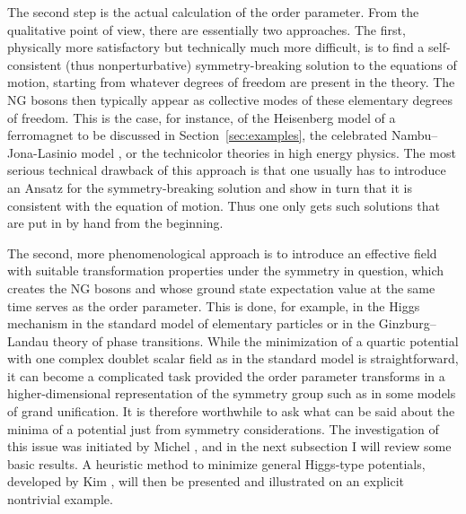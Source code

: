 \documentclass[final,2p,times,12pt,sort&compress]{elsarticle}
\begin{document}
The second step is the actual calculation of the order parameter. From the
qualitative point of view, there are essentially two approaches. The first,
physically more satisfactory but technically much more difficult, is to find a
self-consistent (thus nonperturbative) symmetry-breaking solution to the
equations of motion, starting from whatever degrees of freedom are present in
the theory. The NG bosons then typically appear as collective modes of these
elementary degrees of freedom. This is the case, for instance, of the
Heisenberg model of a ferromagnet to be discussed in Section~\ref{sec:examples},
the celebrated Nambu--Jona-Lasinio model \cite{Nambu:1961tp,Nambu:1961fr}, or
the technicolor theories in high energy physics. The most serious technical
drawback of this approach is that one usually has to introduce an Ansatz for the
symmetry-breaking solution and show in turn that it is consistent with the
equation of motion. Thus one only gets such solutions that are put in by hand
from the beginning.

The second, more phenomenological approach is to introduce an effective field
with suitable transformation properties under the symmetry in question, which
creates the NG bosons and whose ground state expectation value at the same time
serves as the order parameter. This is done, for example, in the Higgs mechanism
in the standard model of elementary particles or in the Ginzburg--Landau theory
of phase transitions. While the minimization of a quartic potential with one
complex doublet scalar field as in the standard model is straightforward, it
can become a complicated task provided the order parameter transforms in a
higher-dimensional representation of the symmetry group such as in some models
of grand unification. It is therefore worthwhile to ask what can be said about
the minima of a potential just from symmetry considerations. The investigation
of this issue was initiated by Michel \cite{Michel:1971th,Michel:1980pc}, and
in the next subsection I will review some basic results. A heuristic method to
minimize general Higgs-type potentials, developed by Kim \cite{Kim:1981xu},
will then be presented and illustrated on an explicit nontrivial example.
\end{document}

